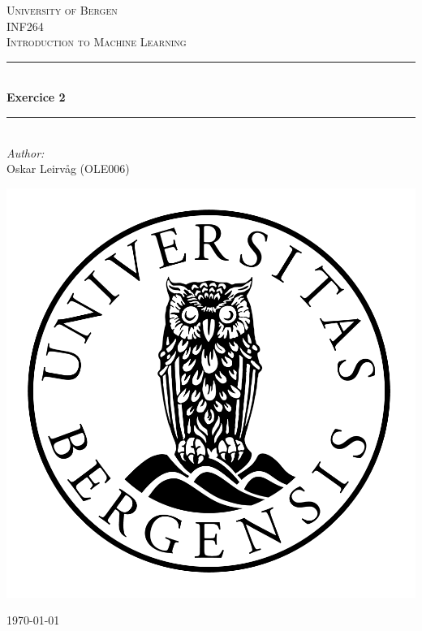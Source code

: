 \begin{titlepage}
    \newcommand{\HRule}{\rule{\linewidth}{0.5mm}}
    \center

    \textsc{\LARGE University of Bergen}\\[1.5cm] %
    \textsc{\Large INF264}\\[0.5cm] %
    \textsc{\large Introduction to Machine Learning}\\[0.5cm] %

    \HRule \\[0.4cm]
    { \huge \bfseries Exercice 2}\\[0.4cm] %
    \HRule \\[1.5cm]

    \Large \emph{Author:}\\
    Oskar Leirvåg (OLE006)
    \\[2cm] %

    \centerline{\includegraphics[scale=0.15]{figures/canvas}} %

    {\large \today}\\[3cm] %

    \vfill
\end{titlepage}
